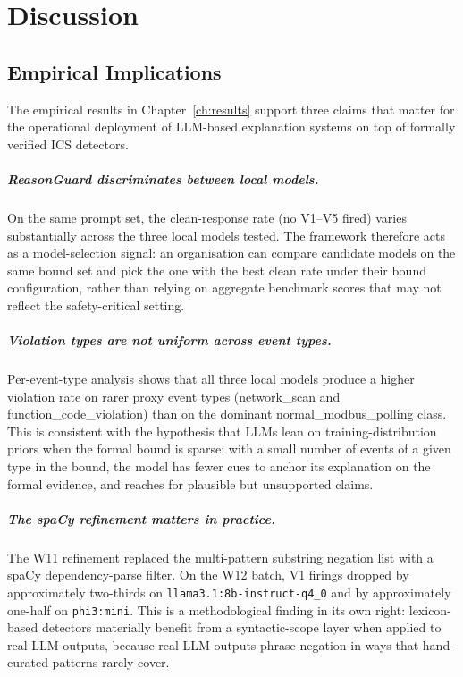 \chapter{Discussion}
\label{ch:discussion}

\section{Empirical Implications}
\label{sec:discussion-empirical}

The empirical results in Chapter~\ref{ch:results} support three claims that
matter for the operational deployment of LLM-based explanation systems on
top of formally verified ICS detectors.

\paragraph{ReasonGuard discriminates between local models.}
On the same prompt set, the clean-response rate (no V1--V5 fired) varies
substantially across the three local models tested. The framework therefore
acts as a model-selection signal: an organisation can compare candidate
models on the same bound set and pick the one with the best clean rate
under their bound configuration, rather than relying on aggregate benchmark
scores that may not reflect the safety-critical setting.

\paragraph{Violation types are not uniform across event types.}
Per-event-type analysis shows that all three local models produce a higher
violation rate on rarer proxy event types (network\_scan and
function\_code\_violation) than on the dominant normal\_modbus\_polling
class. This is consistent with the hypothesis that LLMs lean on
training-distribution priors when the formal bound is sparse: with a small
number of events of a given type in the bound, the model has fewer cues to
anchor its explanation on the formal evidence, and reaches for plausible
but unsupported claims.

\paragraph{The spaCy refinement matters in practice.}
The W11 refinement replaced the multi-pattern substring negation list with
a spaCy dependency-parse filter. On the W12 batch, V1 firings dropped by
approximately two-thirds on \texttt{llama3.1:8b-instruct-q4\_0} and by
approximately one-half on \texttt{phi3:mini}. This is a methodological
finding in its own right: lexicon-based detectors materially benefit from a
syntactic-scope layer when applied to real LLM outputs, because real LLM
outputs phrase negation in ways that hand-curated patterns rarely cover.

